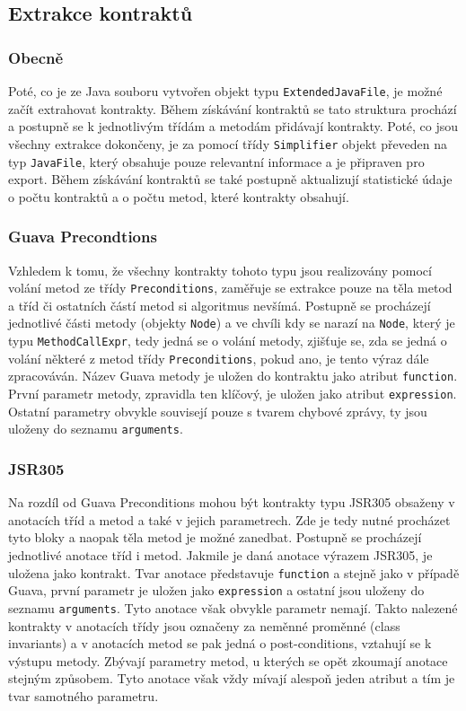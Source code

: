 		\subsection{Extrakce kontraktů}
			
			\subsubsection{Obecně}
				Poté, co je ze Java souboru vytvořen objekt typu \texttt{ExtendedJavaFile}, je možné začít extrahovat kontrakty. Během získávání kontraktů se tato struktura prochází a postupně se k jednotlivým třídám a metodám přidávají kontrakty. Poté, co jsou všechny extrakce dokončeny, je za pomocí třídy \texttt{Simplifier} objekt převeden na typ \texttt{JavaFile}, který obsahuje pouze relevantní informace a je připraven pro export.	Během získávání kontraktů se také postupně aktualizují statistické údaje o počtu kontraktů a o počtu metod, které kontrakty obsahují.		
			
			\subsubsection{Guava Precondtions}
				Vzhledem k tomu, že všechny kontrakty tohoto typu jsou realizovány pomocí volání metod ze třídy \texttt{Preconditions}, zaměřuje se extrakce pouze na těla metod a tříd či ostatních částí metod si algoritmus nevšímá. Postupně se procházejí jednotlivé části metody (objekty \texttt{Node}) a ve chvíli kdy se narazí na \texttt{Node}, který je typu \texttt{MethodCallExpr}, tedy jedná se o volání metody, zjišťuje se, zda se jedná o volání některé z metod třídy \texttt{Preconditions}, pokud ano, je tento výraz dále zpracováván. Název Guava metody je uložen do kontraktu jako atribut \texttt{function}. První parametr metody, zpravidla ten klíčový, je uložen jako atribut \texttt{expression}. Ostatní parametry obvykle souvisejí pouze s tvarem chybové zprávy, ty jsou uloženy do seznamu \texttt{arguments}.
				
			\subsubsection{JSR305}
				Na rozdíl od Guava Preconditions mohou být kontrakty typu JSR305 obsaženy v anotacích tříd a metod a také v jejich parametrech. Zde je tedy nutné procházet tyto bloky a naopak těla metod je možné zanedbat. Postupně se procházejí jednotlivé anotace tříd i metod. Jakmile je daná anotace výrazem JSR305, je uložena jako kontrakt. Tvar anotace představuje \texttt{function} a stejně jako v případě Guava, první parametr je uložen jako \texttt{expression} a ostatní jsou uloženy do seznamu \texttt{arguments}. Tyto anotace však obvykle parametr nemají. Takto nalezené kontrakty v anotacích třídy jsou označeny za neměnné proměnné (class invariants) a v anotacích metod se pak jedná o post-conditions, vztahují se k výstupu metody. Zbývají parametry metod, u kterých se opět zkoumají anotace stejným způsobem. Tyto anotace však vždy mívají alespoň jeden atribut a tím je tvar samotného parametru.


